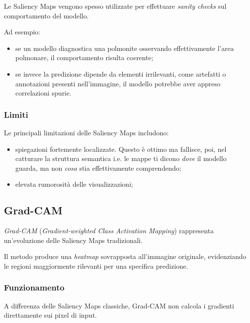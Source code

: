Le Saliency Maps vengono spesso utilizzate per effettuare \textit{sanity checks} sul comportamento del modello.

Ad esempio:

\begin{itemize}
    \item se un modello diagnostica una polmonite osservando effettivamente l'area polmonare, il comportamento risulta coerente;
    
    \item se invece la predizione dipende da elementi irrilevanti, come artefatti o annotazioni presenti nell'immagine, il modello potrebbe aver appreso correlazioni spurie.
\end{itemize}

\subsubsection{Limiti}

Le principali limitazioni delle Saliency Maps includono:

\begin{itemize}
    \item spiegazioni fortemente localizzate. Questo è ottimo ma fallisce, poi, nel catturare la struttura semantica i.e. le mappe ti dicono \textit{dove} il modello guarda, ma non \textit{cosa} stia effettivamente comprendendo;
    
    \item elevata rumorosità delle visualizzazioni;        
\end{itemize}

\subsection{Grad-CAM}

\textit{Grad-CAM} (\textit{Gradient-weighted Class Activation Mapping}) rappresenta un'evoluzione delle Saliency Maps tradizionali.

Il metodo produce una \textit{heatmap} sovrapposta all'immagine originale, evidenziando le regioni maggiormente rilevanti per una specifica predizione.

\subsubsection{Funzionamento}

A differenza delle Saliency Maps classiche, Grad-CAM non calcola i gradienti direttamente sui pixel di input.

